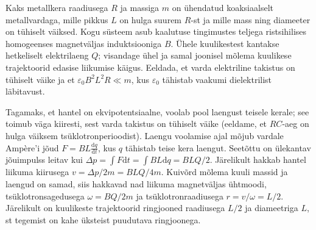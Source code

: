 
Kaks metallkera raadiusega $R$ ja massiga $m$ on ühendatud koaksiaalselt metallvardaga, mille pikkus $L$ on hulga suurem $R$-st ja mille mass ning diameeter on tühiselt väiksed. Kogu süsteem asub kaalutuse tingimustes teljega ristsihilises homogeenses magnetväljas induktsiooniga $B$. Ühele kuulikestest kantakse hetkeliselt elektrilaeng $Q$; visandage ühel ja samal joonisel mõlema kuulikese trajektoorid edasise liikumise käigus. Eeldada, et varda elektriline takistus on tühiselt väike ja et $\varepsilon_0B^2L^2R\ll m$, kus $\varepsilon_0$ tähistab vaakumi dielektrilist läbitavust.



\hint

\solu
Tagamaks, et hantel on ekvipotentsiaalne, voolab pool laengust teisele kerale; see toimub väga kiiresti, sest varda takistus on tühiselt väike (eeldame, et $RC$-aeg on hulga väiksem tsüklotronperioodist). Laengu voolamise ajal mõjub vardale Ampère'i jõud $F=BL\frac {\mathrm d q}{\mathrm dt}$, kus $q$ tähistab teise kera laengut. Seetõttu on ülekantav jõuimpulss leitav kui $\Delta p=\int F\mathrm dt=\int BL\mathrm dq = BLQ/2$. Järelikult hakkab hantel liikuma kiirusega $v=\Delta p/2m=BLQ/4m$. Kuivõrd mõlema kuuli massid ja laengud on samad, siis hakkavad nad liikuma magnetväljas ühtmoodi, tsüklotronsagedusega $\omega=BQ/2m$ ja tsüklotronraadiusega $r=v/\omega=L/2$. Järelikult on kuulikeste trajektoorid ringjooned raadiusega $L/2$ ja diameetriga $L$, st tegemist on kahe üksteist puudutava ringjoonega.
\probend